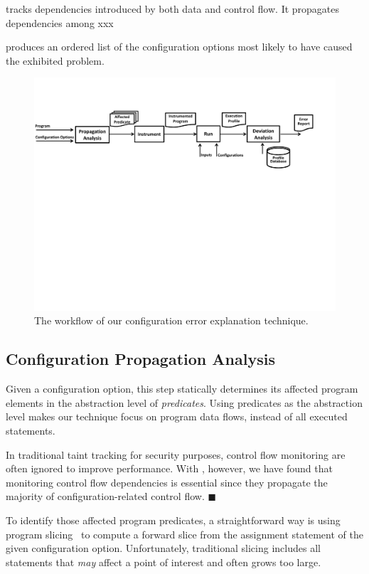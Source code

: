 \ourtool tracks dependencies introduced by both data and
control flow. It propagates dependencies among xxx

\ourtool produces an ordered list of the 
configuration options most likely to have caused the exhibited
problem.

\begin{figure}[!]
  \centering
  \includegraphics[scale=0.600]{architecture}
  \vspace*{-2.0ex}\caption {{\label{fig:workflow} The workflow of our configuration error explanation technique.
}}
\end{figure}

\subsection{Configuration Propagation Analysis}
\label{sec:prop}

Given a configuration option, this step statically determines its affected program
elements in the abstraction level of \textit{predicates}. Using predicates
as the abstraction level makes our technique focus on program data flows, instead
of all executed statements.

In traditional taint tracking for security purposes, control
flow monitoring are often ignored to improve performance.
With \ourtool, however, we have found that monitoring control flow
dependencies is essential since they propagate the majority of
configuration-related control flow. $\blacksquare$


To identify those affected program predicates, a straightforward way is using program
slicing~\cite{Horwitz:1988:ISU} to compute a forward slice from the assignment statement of the given
configuration option. Unfortunately, traditional slicing includes all statements that
\textit{may} affect a point of interest and often grows too large.

